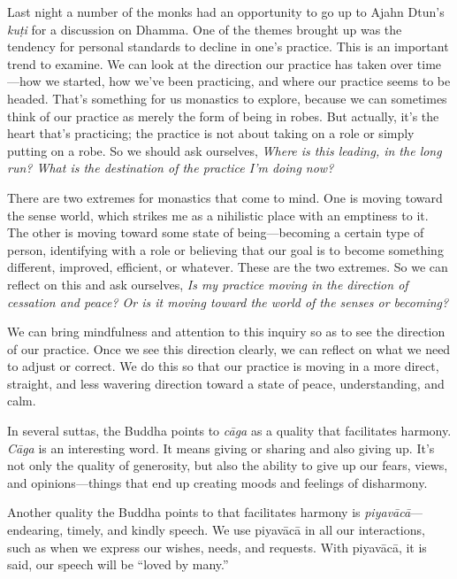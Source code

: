 
Last night a number of the monks had an opportunity to go up to Ajahn 
Dtun's \emph{kuṭi} for a discussion on Dhamma. One of the themes 
brought up was the tendency for personal standards to decline in one's 
practice. This is an important trend to examine. We can look at the 
direction our practice has taken over time---how we started, how we've 
been practicing, and where our practice seems to be headed. That's 
something for us monastics to explore, because we can sometimes think 
of our practice as merely the form of being in robes. But actually, 
it's the heart that's practicing; the practice is not about taking on a 
role or simply putting on a robe. So we should ask ourselves, 
\emph{Where is this leading, in the long run? What is the destination 
of the practice I'm doing now?}

There are two extremes for monastics that come to mind. One is moving 
toward the sense world, which strikes me as a nihilistic place with an 
emptiness to it. The other is moving toward some state of 
being---becoming a certain type of person, identifying with a role or 
believing that our goal is to become something different, improved, 
efficient, or whatever. These are the two extremes. So we can reflect 
on this and ask ourselves, \emph{Is my practice moving in the direction 
of cessation and peace? Or is it moving toward the world of the senses 
or becoming?}

We can bring mindfulness and attention to this inquiry so as to see the
direction of our practice. Once we see this \mbox{direction} clearly, we
can reflect on what we need to adjust or correct. We do this so that our
practice is moving in a more direct, straight, and less wavering
direction toward a state of peace, understanding, and calm.


In several suttas, the Buddha points to \emph{cāga} as a quality that 
facilitates harmony. \emph{Cāga} is an interesting word. It means 
giving or sharing and also giving up. It's not only the quality of 
generosity, but also the ability to give up our fears, views, and 
opinions---things that end up creating moods and feelings of disharmony.

Another quality the Buddha points to that facilitates harmony is 
\emph{piyavācā}---endearing, timely, and kindly speech. We use 
piyavācā in all our interactions, such as when we express our wishes, 
needs, and requests. With piyavācā, it is said, our speech will be 
``loved by many.''

